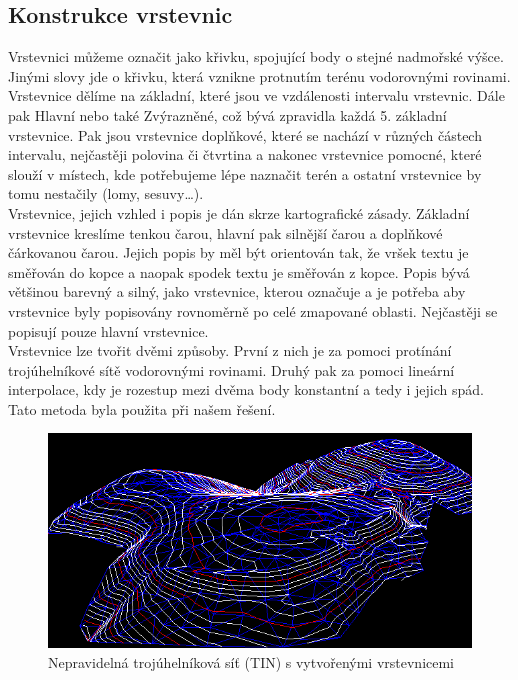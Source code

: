 \documentclass[a4paper,11pt,twoside]{article}
\begin{document}
\subsection{Konstrukce vrstevnic}
Vrstevnici můžeme označit jako křivku, spojující body o stejné nadmořské výšce. Jinými slovy jde o křivku, která vznikne protnutím terénu vodorovnými rovinami. Vrstevnice dělíme na základní, které jsou ve vzdálenosti intervalu vrstevnic. Dále pak Hlavní nebo také Zvýrazněné, což bývá zpravidla každá 5. základní vrstevnice. Pak jsou vrstevnice doplňkové, které se nachází v různých částech intervalu, nejčastěji polovina či čtvrtina a nakonec vrstevnice pomocné, které slouží v místech, kde potřebujeme lépe naznačit terén a ostatní vrstevnice by tomu nestačily (lomy, sesuvy…). \\
\indent Vrstevnice, jejich vzhled i popis je dán skrze kartografické zásady. Základní vrstevnice kreslíme tenkou čarou, hlavní pak silnější čarou a doplňkové čárkovanou čarou. Jejich popis by měl být orientován tak, že vršek textu je směřován do kopce a naopak spodek textu je směřován z kopce. Popis bývá většinou barevný a silný, jako vrstevnice, kterou označuje a je potřeba aby vrstevnice byly popisovány rovnoměrně po celé zmapované oblasti. Nejčastěji se popisují pouze hlavní vrstevnice.\\
\indent Vrstevnice lze tvořit dvěmi způsoby. První z nich je za pomoci protínání trojúhelníkové sítě vodorovnými rovinami. Druhý pak za pomoci lineární interpolace, kdy je rozestup mezi dvěma body konstantní a tedy i jejich spád. Tato metoda byla použita při našem řešení.

\vspace{0.2cm}
\begin{figure}[hbt!] 
\begin{center}
\includegraphics[width=15cm]{pictures/tin.png} 
\caption[Nepravidelná trojúhelníková síť (TIN) s vytvořenými vrstevnicemi]{Nepravidelná trojúhelníková síť (TIN) s vytvořenými vrstevnicemi \cite{tin}}
\label{fig:jar}
\end{center}
\end{figure}
\end{document}
